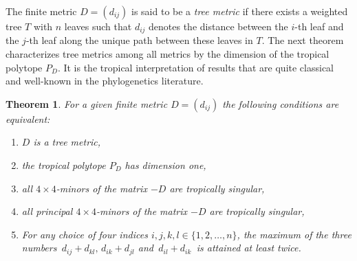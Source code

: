 \documentclass[11pt]{amsart}
\newtheorem{thm}{Theorem}
\begin{document}
The finite metric $D = (d_{ij})$ is said to be
a \emph{tree metric}
if there exists a weighted tree $T$ with $n$ leaves
such that
$d_{ij}$ denotes the distance between the
$i$-th leaf and the $j$-th leaf along the
unique path between these leaves in $T$.
The next theorem characterizes tree metrics
among all metrics by the dimension of the
tropical polytope $P_D$. It is the tropical interpretation
of results that are quite classical and well-known in the
phylogenetics literature.

\begin{thm}\label{buneman}
For a given finite metric $D = (d_{ij})$
the following conditions are equivalent:
\begin{enumerate}
\item $D$ is a tree metric,
\item the tropical polytope $P_D$ has dimension one,
\item all $4\times 4$-minors of the matrix $-D$ are tropically singular,
\item all principal $4\times 4$-minors of the matrix $-D$ are tropically 
singular,
\item For any choice of four indices $i,j,k,l \in \{1,2,\ldots,n\}$,
the maximum of the three numbers
$\,d_{ij} + d_{kl},\, d_{ik} + d_{jl}$ and $\, d_{il} + d_{ik}\,$
is attained at least twice.
\end{enumerate}
\end{thm}
\end{document}
